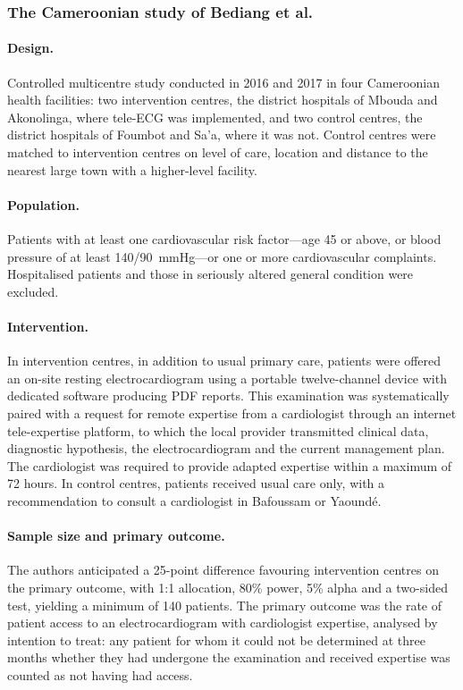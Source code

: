 \documentclass[12pt,a4paper,oneside]{report}
\begin{document}
\subsubsection{The Cameroonian study of Bediang et al.}\label{sec:bediang}

\paragraph{Design.} Controlled multicentre study conducted in 2016 and 2017 in four Cameroonian health facilities: two intervention centres, the district hospitals of Mbouda and Akonolinga, where tele-ECG was implemented, and two control centres, the district hospitals of Foumbot and Sa'a, where it was not. Control centres were matched to intervention centres on level of care, location and distance to the nearest large town with a higher-level facility.

\paragraph{Population.} Patients with at least one cardiovascular risk factor---age 45 or above, or blood pressure of at least 140/90~mmHg---or one or more cardiovascular complaints. Hospitalised patients and those in seriously altered general condition were excluded.

\paragraph{Intervention.} In intervention centres, in addition to usual primary care, patients were offered an on-site resting electrocardiogram using a portable twelve-channel device with dedicated software producing PDF reports. This examination was systematically paired with a request for remote expertise from a cardiologist through an internet tele-expertise platform, to which the local provider transmitted clinical data, diagnostic hypothesis, the electrocardiogram and the current management plan. The cardiologist was required to provide adapted expertise within a maximum of 72 hours. In control centres, patients received usual care only, with a recommendation to consult a cardiologist in Bafoussam or Yaoundé.

\paragraph{Sample size and primary outcome.} The authors anticipated a 25-point difference favouring intervention centres on the primary outcome, with 1:1 allocation, 80\% power, 5\% alpha and a two-sided test, yielding a minimum of 140 patients. The primary outcome was the rate of patient access to an electrocardiogram with cardiologist expertise, analysed by intention to treat: any patient for whom it could not be determined at three months whether they had undergone the examination and received expertise was counted as not having had access.
\end{document}
